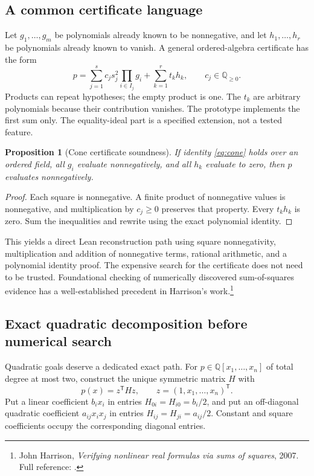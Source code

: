 \documentclass[11pt,letterpaper]{article}
\newcommand{\Lean}{\textsf{Lean}}
\newcommand{\Q}{\mathbb{Q}}
\newcommand{\src}[2]{\footnote{#2. Full reference: \cite{#1}.}}
\newtheorem{proposition}{Proposition}[section]
\theoremstyle{definition}
\theoremstyle{remark}
\begin{document}
\subsection{A common certificate language}
Let $g_1,\ldots,g_m$ be polynomials already known to be nonnegative, and let $h_1,\ldots,h_r$ be polynomials already known to vanish. A general ordered-algebra certificate has the form
\begin{equation}\label{eq:cone}
p=\sum_{j=1}^{s} c_j s_j^2\prod_{i\in I_j}g_i
  +\sum_{k=1}^{r} t_kh_k,
\qquad c_j\in\Q_{\geq0}.
\end{equation}
Products can repeat hypotheses; the empty product is one. The $t_k$ are arbitrary polynomials because their contribution vanishes. The prototype implements the first sum only. The equality-ideal part is a specified extension, not a tested feature.

\begin{proposition}[Cone certificate soundness]
If identity \eqref{eq:cone} holds over an ordered field, all $g_i$ evaluate nonnegatively, and all $h_k$ evaluate to zero, then $p$ evaluates nonnegatively.
\end{proposition}
\begin{proof}
Each square is nonnegative. A finite product of nonnegative values is nonnegative, and multiplication by $c_j\geq0$ preserves that property. Every $t_kh_k$ is zero. Sum the inequalities and rewrite using the exact polynomial identity.
\end{proof}
This yields a direct \Lean{} reconstruction path using square nonnegativity, multiplication and addition of nonnegative terms, rational arithmetic, and a polynomial identity proof. The expensive search for the certificate does not need to be trusted. Foundational checking of numerically discovered sum-of-squares evidence has a well-established precedent in Harrison's work.\src{harrison}{John Harrison, \emph{Verifying nonlinear real formulas via sums of squares}, 2007}

\subsection{Exact quadratic decomposition before numerical search}
Quadratic goals deserve a dedicated exact path. For $p\in\Q[x_1,\ldots,x_n]$ of total degree at most two, construct the unique symmetric matrix $H$ with
\[
p(x)=z^\mathsf{T}Hz,\qquad z=(1,x_1,\ldots,x_n)^\mathsf{T}.
\]
Put a linear coefficient $b_ix_i$ in entries $H_{0i}=H_{i0}=b_i/2$, and put an off-diagonal quadratic coefficient $a_{ij}x_ix_j$ in entries $H_{ij}=H_{ji}=a_{ij}/2$. Constant and square coefficients occupy the corresponding diagonal entries.
\end{document}
